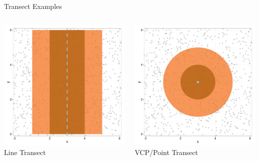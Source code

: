 \documentclass{beamer}
\begin{document}
\begin{frame}{Transect Examples}

	\begin{columns}
		\begin{column}{0.48\textwidth}
		\centering
		\includegraphics[width=\textwidth]{../images/slides-LTr.pdf}\\
		Line Transect
		\end{column}
		\begin{column}{0.48\textwidth}
		\centering
		\includegraphics[width=\textwidth]{../images/slides-VCPr.pdf}\\
		VCP/Point Transect
		\end{column}
	\end{columns}

\end{frame}
\end{document}

